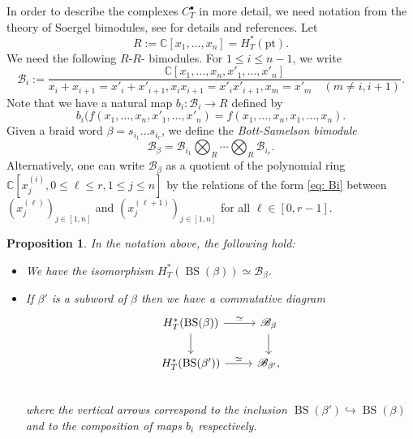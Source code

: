 \documentclass[10pt]{amsart}
\theoremstyle{plain}
\newtheorem{prop}[thm]{Proposition}
\theoremstyle{definition}
\theoremstyle{remark}
\numberwithin{equation}{section}
\newcommand{\C}{\mathbb{C}}
\newcommand{\SB}{\mathscr{B}}
\renewcommand{\C}{\mathbb{C}}
\DeclareMathOperator{\BS}{BS}
\begin{document}
In order to describe the complexes $C^{\bullet}_T$ in more detail, we need notation from the theory of Soergel bimodules, see \cite{soergelbook} for details and references. Let 
$$
R:=\C[x_1,\ldots,x_n]=H^{*}_T(\mathrm{pt}).
$$
We need the following $R$-$R$- bimodules. For $1\le i\le n-1$, we write
\begin{equation}
\label{eq: Bi}
\SB_{i}:=\frac{\C[x_1,\ldots,x_n,x'_1,\ldots,x'_n]}{x_{i}+x_{i+1}=x'_{i}+x'_{i+1},x_{i}x_{i+1}=x'_{i}x'_{i+1},x_m=x'_m\quad (m\neq i,i+1)}.
\end{equation}
Note that we have a natural map $b_{i}:\SB_{i}\to R$ defined by 
$$
b_{i}(f(x_1,\ldots,x_n,x'_1,\ldots,x'_n)=f(x_1,\ldots,x_n,x_1,\ldots,x_n).
$$
Given a braid word $\beta=s_{i_1}\ldots s_{i_r}$, we define the {\it Bott-Samelson bimodule}
$$
\SB_{\beta}=\SB_{i_1}\bigotimes_{R}\cdots \bigotimes_{R} \SB_{i_r}.
$$
Alternatively, one can write $\SB_{\beta}$ as a quotient of the polynomial ring $\C\left[x^{(i)}_j,0\le \ell \le r,1\le j\le n\right]$ by the relations of the form \eqref{eq: Bi} between $(x^{(\ell)}_{j})_{j \in [1,n]}$ and $(x^{(\ell+1)}_{j})_{j \in [1,n]}$ for all $\ell \in [0, r - 1]$. 

\begin{prop}
\label{prop: homology bs} In the notation above, the following hold:
\begin{itemize}
    \item[(a)] We have the isomorphism $H^*_T(\BS(\beta))\simeq \SB_{\beta}$.\\
\item[(b)] If $\beta'$ is a subword of $\beta$  then we have a commutative diagram
$$
\begin{tikzcd}
H^*_T(\BS(\beta)) \arrow{r}{\simeq} \arrow{d}& \SB_{\beta} \arrow{d}\\
H^*_T(\BS(\beta')) \arrow{r}{\simeq}  & \SB_{\beta'},\\
\end{tikzcd}
$$
where the vertical arrows correspond to the inclusion $\BS(\beta')\hookrightarrow \BS(\beta)$ and to the composition of maps $b_i$ respectively.
\end{itemize}
\end{prop}
\end{document}
